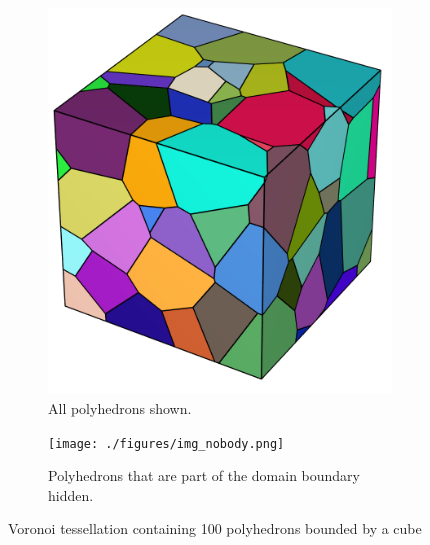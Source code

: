 \documentclass[micro_gen.tex]{subfiles}
\begin{document}
\begin{figure}
\centering
\begin{subfigure}[b]{.5\textwidth}
  \centering
  \includegraphics[width=.5\linewidth]{./figures/img_body.png}
  \caption{All polyhedrons shown.}
  \label{fig:pois_voronoi_a}
\end{subfigure}%
\begin{subfigure}[b]{.5\textwidth}
  \centering
  \texttt{[image: ./figures/img\_nobody.png]}
  \caption{Polyhedrons that are part of the domain boundary hidden.}
  \label{fig:pois_voronoi_b}
\end{subfigure}
\caption{Voronoi tessellation containing 100 polyhedrons bounded by a cube}
\label{fig:pois_voronoi}
\end{figure}
\end{document}
